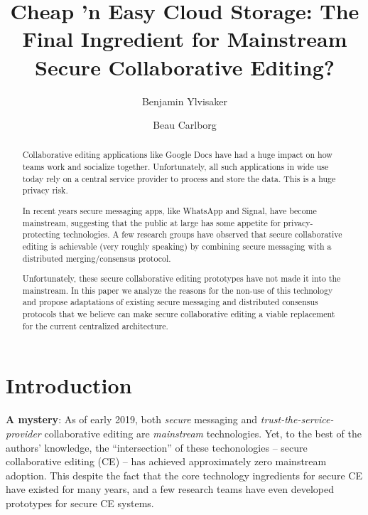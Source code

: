 \documentclass[runningheads]{llncs}
\begin{document}
\title{Cheap 'n Easy Cloud Storage: The Final Ingredient for Mainstream Secure Collaborative Editing?}

\author{Benjamin Ylvisaker \and
Beau Carlborg}


\maketitle

\begin{abstract}

Collaborative editing applications like Google Docs have had a huge impact on how teams work and socialize together.
Unfortunately, all such applications in wide use today rely on a central service provider to process and store the data.
This is a huge privacy risk.

In recent years secure messaging apps, like WhatsApp and Signal, have become mainstream, suggesting that the public at large has some appetite for privacy-protecting technologies.
A few research groups have observed that secure collaborative editing is achievable (very roughly speaking) by combining secure messaging with a distributed merging{\slash}consensus protocol.

Unfortunately, these secure collaborative editing prototypes have not made it into the mainstream.
In this paper we analyze the reasons for the non-use of this technology and propose adaptations of existing secure messaging and distributed consensus protocols that we believe can make secure collaborative editing a viable replacement for the current centralized architecture.

\end{abstract}

\section{Introduction}

\textbf{A mystery}:
As of early 2019, both \emph{secure} messaging and \emph{trust-the-service-provider} collaborative editing are \emph{mainstream} technologies.
Yet, to the best of the authors' knowledge, the ``intersection'' of these techonologies -- secure collaborative editing (CE) -- has achieved approximately zero mainstream adoption.
This despite the fact that the core technology ingredients for secure CE have existed for many years, and a few research teams have even developed prototypes for secure CE systems.
\end{document}
